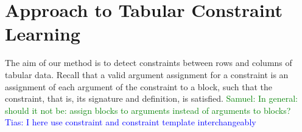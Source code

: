 \documentclass{IEEEtran}
\newcommand{\samuel}[1]{\textcolor{green}{{\sc Samuel:} #1}\xspace}
\newcommand{\tias}[1]{\textcolor{blue}{{\sc Tias:} #1}\xspace}
\newcommand{\constraints}{\ensuremath{\mathcal{T}}\xspace}
\newcommand{\format}[1]{\textit{#1}\xspace}
\newcommand{\template}{\format{constraint template}}
\newcommand{\dependencies}{\ensuremath{\mathcal{D}}\xspace}
\newcommand{\groups}{\ensuremath{\mathcal{B}}\xspace}
\theoremstyle{definition}
\newtheorem{definition}{Definition}
\begin{document}
%







\newcommand{\tcl}{Tabular Constraint Learning}
\section{Approach to Tabular Constraint Learning}\label{sec:approach}
The aim of our method is to detect constraints between rows and columns of tabular data. Recall that a valid argument assignment for a constraint is an assignment of each argument of the constraint to a block, such that the constraint, that is, its signature and definition, is satisfied.
\samuel{In general: should it not be: assign blocks to arguments instead of arguments to blocks?}
\tias{I here use constraint and constraint template interchangeably}
\end{document}
